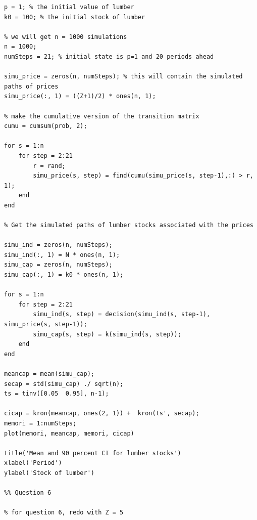 \documentclass[12pt]{article}
\begin{document}
\begin{verbatim}
p = 1; % the initial value of lumber
k0 = 100; % the initial stock of lumber

% we will get n = 1000 simulations
n = 1000;
numSteps = 21; % initial state is p=1 and 20 periods ahead

simu_price = zeros(n, numSteps); % this will contain the simulated paths of prices
simu_price(:, 1) = ((Z+1)/2) * ones(n, 1);

% make the cumulative version of the transition matrix
cumu = cumsum(prob, 2);

for s = 1:n
    for step = 2:21
        r = rand;
        simu_price(s, step) = find(cumu(simu_price(s, step-1),:) > r, 1);
    end
end

% Get the simulated paths of lumber stocks associated with the prices

simu_ind = zeros(n, numSteps);
simu_ind(:, 1) = N * ones(n, 1);
simu_cap = zeros(n, numSteps);
simu_cap(:, 1) = k0 * ones(n, 1);

for s = 1:n
    for step = 2:21
        simu_ind(s, step) = decision(simu_ind(s, step-1), simu_price(s, step-1));
        simu_cap(s, step) = k(simu_ind(s, step));
    end
end

meancap = mean(simu_cap);
secap = std(simu_cap) ./ sqrt(n);
ts = tinv([0.05  0.95], n-1); 

cicap = kron(meancap, ones(2, 1)) +  kron(ts', secap);
memori = 1:numSteps;
plot(memori, meancap, memori, cicap)

title('Mean and 90 percent CI for lumber stocks')
xlabel('Period')
ylabel('Stock of lumber')

%% Question 6

% for question 6, redo with Z = 5
\end{verbatim}
\end{document}
